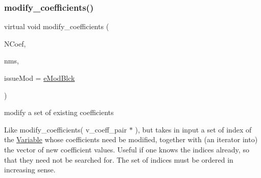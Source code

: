 \subsubsection{\texorpdfstring{modify\+\_\+coefficients()}{modify\_coefficients()}\hspace{0.1cm}{\footnotesize\ttfamily [2/4]}}
{\footnotesize\ttfamily virtual void modify\+\_\+coefficients (\begin{DoxyParamCaption}\item[{\mbox{\hyperlink{class_s_m_spp__di__unipi__it_1_1_linear_function_a9e665512d3a7f7aae5031e99c675cc11}{c\+\_\+v\+\_\+coeff\+\_\+it}}}]{N\+Coef,  }\item[{\mbox{\hyperlink{group___thin_var_dep_interface___c_l_a_s_s_e_s_ga03461123d4f6090aefeb97ef653d3f2b}{c\+\_\+\+Vec\+\_\+\+Index}}}]{nms,  }\item[{\mbox{\hyperlink{group___modification___t_y_p_e_s_ga544246d8c462e9a2d817c2c30797968f}{c\+\_\+\+Mod\+Param}}}]{issue\+Mod = {\ttfamily \mbox{\hyperlink{group___modification___t_y_p_e_s_gga48fddcdd03a03f49b7e389ca1ed938d4a21b14b26b1c0093a0905f6fc010bad29}{e\+Mod\+Blck}}} }\end{DoxyParamCaption})\hspace{0.3cm}{\ttfamily [virtual]}}



modify a set of existing coefficients 

Like modify\+\_\+coefficients( v\+\_\+coeff\+\_\+pair $\ast$ ), but takes in input a set of index of the \mbox{\hyperlink{class_s_m_spp__di__unipi__it_1_1_variable}{Variable}} whose coefficients need be modified, together with (an iterator into) the vector of new coefficient values. Useful if one knows the indices already, so that they need not be searched for. The set of indices must be ordered in increasing sense. \mbox{\label{class_s_m_spp__di__unipi__it_1_1_linear_function_a302cec77ff24f7f32e394eeb84b5569c}} 
